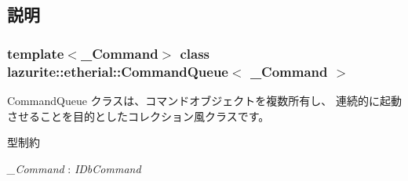 \subsection{説明}
\subsubsection*{template$<$\_\-Command$>$ class lazurite::etherial::CommandQueue$<$ \_\-Command $>$}

CommandQueue クラスは、コマンドオブジェクトを複数所有し、 連続的に起動させることを目的としたコレクション風クラスです。 \begin{Desc}
\item[型制約]\begin{description}
\item[{\em \_\-Command} : {\em IDbCommand}]\end{description}
\end{Desc}


